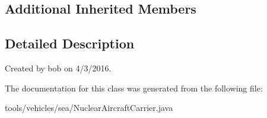 \subsection*{Additional Inherited Members}


\subsection{Detailed Description}
Created by bob on 4/3/2016. 

The documentation for this class was generated from the following file\+:\begin{DoxyCompactItemize}
\item 
tools/vehicles/sea/Nuclear\+Aircraft\+Carrier.\+java\end{DoxyCompactItemize}
